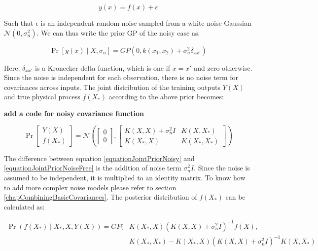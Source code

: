 \begin{equation}\label{eqNoiseEquation}
y(x) = f(x) + \epsilon
\end{equation}

Such that $\epsilon$ is an independent random noise sampled from a white noise Gaussian $\mathcal{N}(0, \sigma_{n}^{2})$. We can thus write the prior GP of the noisy case as:

\begin{equation}\label{equationMeanZeroGPNoisydefinition}
\Pr[y(x) \mid X, \sigma_{n}] = GP(0 , k(x_{1}, x_{2}) + \sigma^{2}_{n}\delta_{xx'})
\end{equation}

Here, $\delta_{xx'}$ is a Kronecker delta function, which is one if $x = x'$ and zero otherwise. Since the noise is independent for each observation, there is no noise term for covariances across inputs. The joint distribution of the training outputs $Y(X)$ and true physical process $f(X_{*})$ according to the above prior becomes:

\textbf{add a code for noisy covariance function}

\begin{equation}\label{equationJointPriorNoisy}
\Pr\left [ \begin{matrix}
Y(X)
\\ f(X_{*})
\end{matrix} \right ]
= 
\mathcal{N}\left (
\left [ \begin{matrix}
0
\\ 0

\end{matrix} \right ] , \left [ \begin{matrix}
K(X, X) + \sigma^{2}_{n}I & K(X, X_{*})\\ 
K(X_{*}, X) & K(X_{*}, X_{*})
\end{matrix} \right ] 
\right )
\end{equation}

The difference between equation \ref{equationJointPriorNoisy} and \ref{equationJointPriorNoiseFree} is the addition of noise term $\sigma^{2}_{n}I$. Since the noise is assumed to be independent, it is multiplied to an identity matrix. To know how to add more complex noise models please refer to section \ref{chapCombiningBasicCovariances}. The posterior distribution of $f(X_{*})$ can be calculated as:

  \begin{equation}\label{eqNoisyPredictiveGP}
  \begin{aligned}
      \Pr(f(X_{*}) \mid X_{*}, X, Y(X)) = GP(  & K(X_{*}, X)( K(X, X) + \sigma^{2}_{n}I)^{-1}f(X),   \\ 
                                & K(X_{*}, X_{*}) - K(X_{*}, X)( K(X, X) + \sigma^{2}_{n}I)^{-1} K(X, X_{*}) 
  \end{aligned}
  \end{equation}


